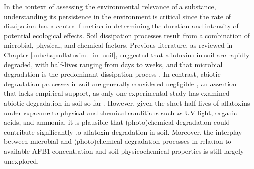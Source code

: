 In the context of assessing the environmental relevance of a substance, understanding its persistence in the environment is critical since the rate of dissipation has a central function in determining the duration and intensity of potential ecological effects.  Soil dissipation processes result from a combination of microbial, physical, and chemical factors. Previous literature, as reviewed in Chapter \ref{subchap:aflatoxins_in_soil}, suggested that aflatoxins in soil are rapidly degraded, with half-lives ranging from days to weeks, and that microbial degradation is the predominant dissipation process \citep{accinelli2008aspergillus, angle1980decomposition, angle1986aflatoxin}. In contrast, abiotic degradation processes in soil are generally considered negligible \citep{fouche2020aflatoxins}, an assertion that lacks empirical support, as only one experimental study has examined abiotic degradation in soil so far \citep{accinelli2008aspergillus}. However, given the short half-lives of aflatoxins under exposure to physical and chemical conditions such as UV light, organic acids, and ammonia, it is plausible that (photo)chemical degradation could contribute significantly to aflatoxin degradation in soil. Moreover, the interplay between microbial and (photo)chemical degradation processes in relation to available AFB1 concentration and soil physicochemical properties is still largely unexplored.

